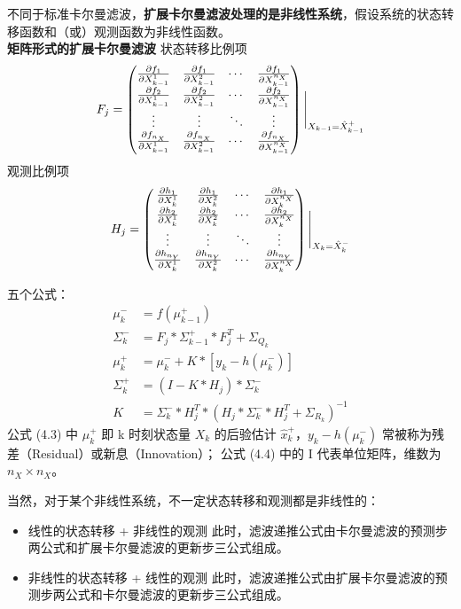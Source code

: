 \documentclass[12pt]{ctexart}
\begin{document}
不同于标准卡尔曼滤波，\textbf{扩展卡尔曼滤波处理的是非线性系统}，假设系统的状态转移函数和（或）观测函数为非线性函数。
~\\
\textcolor{myblue}{\textbf{矩阵形式的扩展卡尔曼滤波}}
状态转移比例项
\[
    F_j= \begin{pmatrix} \frac{\partial f_1}{\partial X_{k-1}^1} & \frac{\partial f_1}{\partial X_{k-1}^2} & \cdots & \frac{\partial f_1}{\partial X_{k-1}^{n_X}} \\ \frac{\partial f_2}{\partial X_{k-1}^1} & \frac{\partial f_2}{\partial X_{k-1}^2} & \cdots & \frac{\partial f_2}{\partial X_{k-1}^{n_X}} \\\vdots & \vdots & \ddots & \vdots \\\frac{\partial f_{n_X}}{\partial X_{k-1}^1} & \frac{\partial f_{n_X}}{\partial X_{k-1}^2} & \cdots & \frac{\partial f_{n_X}}{\partial X_{k-1}^{n_X}} \end{pmatrix} \Bigg|_{X_{k-1}=\hat{X}_{k-1}^+} \\    
\]
观测比例项
\[
    H_j= \begin{pmatrix} \frac{\partial h_1}{\partial X_k^1} & \frac{\partial h_1}{\partial X_k^2} & \cdots & \frac{\partial h_1}{\partial X_k^{n_X}} \\ \frac{\partial h_2}{\partial X_k^1} & \frac{\partial h_2}{\partial X_k^2} & \cdots & \frac{\partial h_2}{\partial X_k^{n_X}} \\ \vdots & \vdots & \ddots & \vdots \\\frac{\partial h_{n_Y}}{\partial X_k^1} & \frac{\partial h_{n_Y}}{\partial X_k^2} & \cdots & \frac{\partial h_{n_Y}}{\partial X_k^{n_X}}\end{pmatrix} \Bigg|_{X_k=\hat{X}_k^-} \\
\]

五个公式：
\begin{align}
    \mu_k^- & = f(\mu_{k-1}^+) \tag{4.1} \\
    \Sigma_k^- & = F_j*\Sigma_{k-1}^+*F_j^T+{\Sigma_{Q_k}} \tag{4.2} \\
    \mu_k^+ & = \mu_k^-+K*[y_k-h(\mu_k^-)] \tag{4.3} \\
    \Sigma_k^+ & = (I-K*H_j)*\Sigma_k^- \tag{4.4} \\
    K & =\Sigma_k^-*H_j^T*(H_j*\Sigma_k^-*H_j^T+{\Sigma_{R_k}})^{-1} \tag{4.5}   
\end{align} 
公式 (4.3) 中 $\mu_k^+$ 即 k 时刻状态量 $X_k$ 的后验估计 $\hat{x}_k^+$，$y_k-h(\mu_k^-)$ 常被称为残差（Residual）或新息（Innovation）；
公式 (4.4) 中的 I 代表单位矩阵，维数为 $n_X \times n_X$。

当然，对于某个非线性系统，不一定状态转移和观测都是非线性的：
\begin{itemize}
    \item 线性的状态转移 + 非线性的观测
    此时，滤波递推公式由卡尔曼滤波的预测步两公式和扩展卡尔曼滤波的更新步三公式组成。
    \item 非线性的状态转移 + 线性的观测
    此时，滤波递推公式由扩展卡尔曼滤波的预测步两公式和卡尔曼滤波的更新步三公式组成。
\end{itemize}
\end{document}

